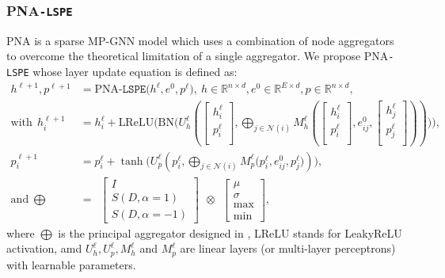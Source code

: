 \documentclass{article} \usepackage{iclr2021_conference,times}
\begin{document}
\subsubsection{PNA\texttt{-LSPE}}
\label{sec:pna_lspe}
PNA \citep{corso2020principal} is a sparse MP-GNN model which uses a combination of node aggregators to overcome the theoretical limitation of a single aggregator. We propose PNA\texttt{-LSPE} whose layer update equation is defined as:
\begin{align}
h^{\ell+1}, p^{\ell+1} &= \text{PNA}\texttt{-LSPE}\Big(h^{\ell}, e^0, p^{\ell}\Big), \ h\in\mathbb{R}^{n\times d}, e^0\in\mathbb{R}^{E\times d}, p\in\mathbb{R}^{n\times d},\\
\text{with} \ \ h_{i}^{\ell+1} &= h_{i}^{\ell} + \text{LReLU}\Big( \text{BN} \Big(U_h^{\ell}\left(\left[ \!\!\begin{array}{c} h_i^\ell \\ p_i^\ell \\ \end{array} \!\!\right], \bigoplus_{j \in \mathcal{N}(i)} M_h^{\ell}\left(\left[ \!\!\begin{array}{c} h_i^\ell \\ p_i^\ell \\ \end{array} \!\!\right], e_{ij}^0, \left[ \!\!\begin{array}{c} h_j^\ell \\ p_j^\ell \\ \end{array} \!\!\right]\right)\right)\Big)\Big), \label{eqn:pna_lspe_1}\\
p_{i}^{\ell+1} &= p_{i}^{\ell} + \tanh \Big(U_p^{\ell}\left(p_i^{\ell}, \bigoplus_{j \in \mathcal{N}(i)} M_p^{\ell}\Big(p_i^{\ell}, e_{ij}^0, p_j^{\ell}\Big)\right)\Big), \label{eqn:pna_lspe_2}\\
\text{and} \ \ \bigoplus \ &= \ \ {\left[\begin{array}{c}
I \\
S(D, \alpha=1) \\
S(D, \alpha=-1)
\end{array}\right]} \ \ \otimes \ \ {\left[\begin{array}{c}
\mu \\
\sigma \\
\max \\
\min
\end{array}\right]}, \label{eqn:pna_layer_agg_scalers}
\end{align} 
where $\bigoplus$ is the principal aggregator designed in \citep{corso2020principal}, LReLU stands for LeakyReLU activation,
amd $U_h^{\ell}, U_p^{\ell}, M_h^{\ell}$ and $M_p^{\ell}$ are linear layers (or multi-layer perceptrons) with learnable parameters.
\end{document}
